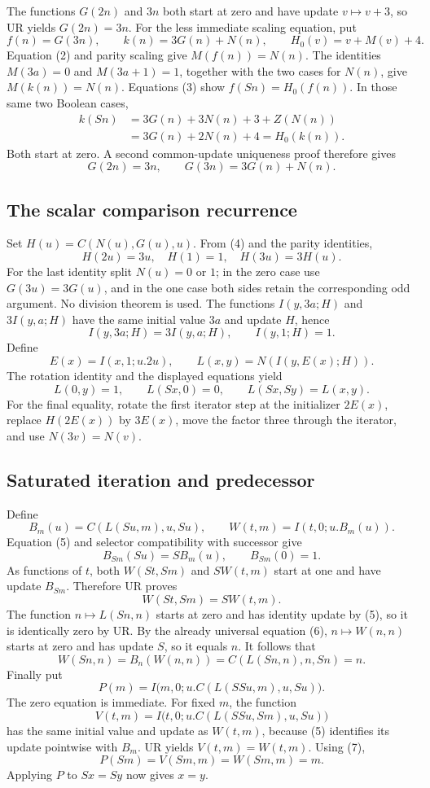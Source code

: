 The functions $G(2n)$ and $3n$ both start at zero and have update
$v\mapsto v+3$, so UR yields $G(2n)=3n$.
For the less immediate scaling equation, put
\[
 f(n)=G(3n),\qquad k(n)=3G(n)+N(n),\qquad H_0(v)=v+M(v)+4.
\]
Equation (2) and parity scaling give $M(f(n))=N(n)$.
The identities $M(3a)=0$ and $M(3a+1)=1$, together with the two cases
for $N(n)$, give $M(k(n))=N(n)$.
Equations (3) show $f(Sn)=H_0(f(n))$.  In those same two Boolean cases,
\[
 \begin{split}
 k(Sn)&=3G(n)+3N(n)+3+Z(N(n))\\
      &=3G(n)+2N(n)+4=H_0(k(n)).
 \end{split}
\]
Both start at zero.  A second common-update uniqueness proof therefore
gives
\[
                  G(2n)=3n,\qquad G(3n)=3G(n)+N(n).       \tag{4}
\]

\subsection{The scalar comparison recurrence}
Set $H(u)=C(N(u),G(u),u)$.  From (4) and the parity identities,
\[
                 H(2u)=3u,\quad H(1)=1,\quad H(3u)=3H(u).
\]
For the last identity split $N(u)=0$ or $1$; in the zero case use
$G(3u)=3G(u)$, and in the one case both sides retain the corresponding
odd argument.  No division theorem is used.
The functions $I(y,3a;H)$ and $3I(y,a;H)$ have the same initial
value $3a$ and update $H$, hence
\[
 I(y,3a;H)=3I(y,a;H),\qquad I(y,1;H)=1.
\]
Define
\[
 E(x)=I(x,1;u.2u),\qquad L(x,y)=N(I(y,E(x);H)).
\]
The rotation identity and the displayed equations yield
\[
 L(0,y)=1,\qquad L(Sx,0)=0,\qquad L(Sx,Sy)=L(x,y).        \tag{5}
\]
For the final equality, rotate the first iterator step at the initializer
$2E(x)$, replace $H(2E(x))$ by $3E(x)$, move the factor three through
the iterator, and use $N(3v)=N(v)$.

\subsection{Saturated iteration and predecessor}
Define
\[
 B_m(u)=C(L(Su,m),u,Su),\qquad W(t,m)=I(t,0;u.B_m(u)).
\]
Equation (5) and selector compatibility with successor give
\[
 B_{Sm}(Su)=S B_m(u),\qquad B_{Sm}(0)=1.
\]
As functions of $t$, both $W(St,Sm)$ and $S W(t,m)$ start at one
and have update $B_{Sm}$.  Therefore UR proves
\[
                             W(St,Sm)=S W(t,m).           \tag{6}
\]
The function $n\mapsto L(Sn,n)$ starts at zero and has identity update
by (5), so it is identically zero by UR.  By the already universal
equation (6), $n\mapsto W(n,n)$ starts at zero and has update $S$,
so it equals $n$.  It follows that
\[
 W(Sn,n)=B_n(W(n,n))=C(L(Sn,n),n,Sn)=n.                   \tag{7}
\]
Finally put
\[
 P(m)=I\bigl(m,0;u.C(L(SSu,m),u,Su)\bigr).
\]
The zero equation is immediate.  For fixed $m$, the function
\[
 V(t,m)=I\bigl(t,0;u.C(L(SSu,Sm),u,Su)\bigr)
\]
has the same initial value and update as $W(t,m)$, because (5)
identifies its update pointwise with $B_m$.  UR yields $V(t,m)=W(t,m)$.
Using (7),
\[
 P(Sm)=V(Sm,m)=W(Sm,m)=m.
\]
Applying $P$ to $Sx=Sy$ now gives $x=y$.

